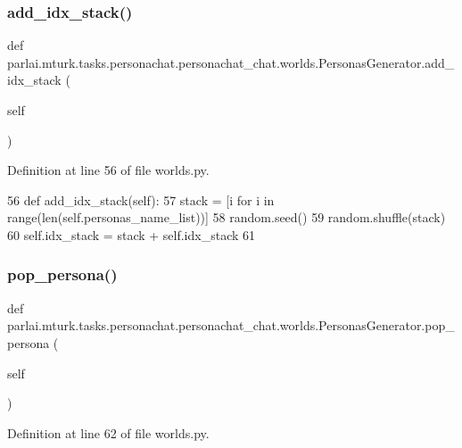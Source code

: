 \subsubsection{\texorpdfstring{add\+\_\+idx\+\_\+stack()}{add\_idx\_stack()}}
{\footnotesize\ttfamily def parlai.\+mturk.\+tasks.\+personachat.\+personachat\+\_\+chat.\+worlds.\+Personas\+Generator.\+add\+\_\+idx\+\_\+stack (\begin{DoxyParamCaption}\item[{}]{self }\end{DoxyParamCaption})}



Definition at line 56 of file worlds.\+py.


\begin{DoxyCode}
56     \textcolor{keyword}{def }add\_idx\_stack(self):
57         stack = [i \textcolor{keywordflow}{for} i \textcolor{keywordflow}{in} range(len(self.personas\_name\_list))]
58         random.seed()
59         random.shuffle(stack)
60         self.idx\_stack = stack + self.idx\_stack
61 
\end{DoxyCode}
\mbox{\label{classparlai_1_1mturk_1_1tasks_1_1personachat_1_1personachat__chat_1_1worlds_1_1PersonasGenerator_a30fafb7faad8a5ad1c0c15bb2e1789f8}} 
\subsubsection{\texorpdfstring{pop\+\_\+persona()}{pop\_persona()}}
{\footnotesize\ttfamily def parlai.\+mturk.\+tasks.\+personachat.\+personachat\+\_\+chat.\+worlds.\+Personas\+Generator.\+pop\+\_\+persona (\begin{DoxyParamCaption}\item[{}]{self }\end{DoxyParamCaption})}



Definition at line 62 of file worlds.\+py.


